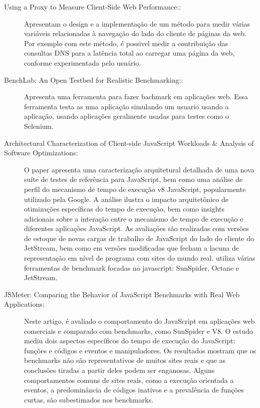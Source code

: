 \documentclass[12pt]{tcc}
\begin{document}
\begin{description}
	\item[Using a Proxy to Measure Client-Side Web Performance::]
	Apresentam o design e a implementação de um método para medir várias variáveis relacionadas à navegação do lado do cliente de páginas da web. Por exemplo com este método, é possivel medir a contribuição das consultas DNS para a latência total ao carregar uma página da web, conforme experimentada pelo usuário.

	\item[BenchLab: An Open Testbed for Realistic Benchmarking::]
	Apresenta uma ferramenta para fazer bachmark em aplicações web. Essa ferramenta testa as uma aplicação simulando um usuario usando a aplicação, usando aplicações geralmente usadas para testes como o Selenium.

	\item[Architectural Characterization of Client-side JavaScript Workloads \& Analysis of Software Optimizations:]
	O paper apresenta uma caracterização arquitetural detalhada de uma nova suíte de testes de referência para JavaScript, bem como uma análise de perfil do mecanismo de tempo de execução v8 JavaScript, popularmente utilizado pela Google. A análise ilustra o impacto arquitetônico de otimizações específicas do tempo de execução, bem como insights adicionais sobre a interação entre o mecanismo de tempo de execução e diferentes aplicações JavaScript. As avaliações são realizadas com versões de estoque de novas cargas de trabalho de JavaScript do lado do cliente do JetStream, bem como em versões modificadas que fecham a lacuna de representação em nível de programa com sites do mundo real.
utiliza várias ferramentas de benchmark focadas no javascript: SunSpider, Octane e JetStream.

	\item[JSMeter: Comparing the Behavior of JavaScript Benchmarks with Real Web Applications:]
	Neste artigo, é avaliado o comportamento do JavaScript em aplicações web comerciais e comparado com benchmarks, como SunSpider e V8. O estudo mediu dois aspectos específicos do tempo de execução do JavaScript: funções e códigos e eventos e manipuladores. Os resultados mostram que os benchmarks não são representativos de muitos sites reais e que as conclusões tiradas a partir deles podem ser enganosas. Alguns comportamentos comuns de sites reais, como a execução orientada a eventos, a predominância de códigos inativos e a prevalência de funções curtas, são subestimados nos benchmarks.

	
	\end{description}
\end{document}
